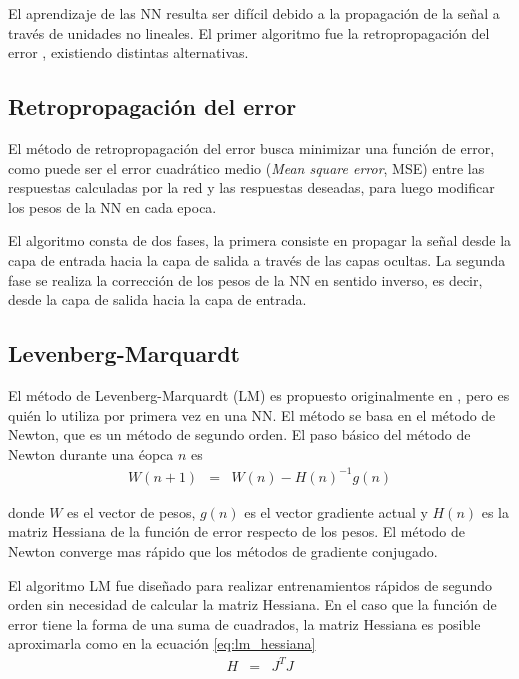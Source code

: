 %
%
%
%
%
%
%
%
%
%
%
%
%
%
%

El aprendizaje de las NN resulta ser difícil debido a la propagación de la señal a través de unidades no lineales. El primer algoritmo fue la retropropagación del error \cite{Werbos1974, Rumelhart1986}, existiendo distintas alternativas.

\subsection{Retropropagación del error}
El método de retropropagación del error busca minimizar una función de error, como puede ser el error cuadrático medio ({\em Mean square error}, MSE) entre las respuestas calculadas por la red y las respuestas deseadas, para luego modificar los pesos de la NN en cada epoca.

El algoritmo consta de dos fases, la primera consiste en propagar la señal desde la capa de entrada hacia la capa de salida a través de las capas ocultas. La segunda fase se realiza la corrección de los pesos de la NN en sentido inverso, es decir, desde la capa de salida hacia la capa de entrada.

\subsection{Levenberg-Marquardt}
El método de Levenberg-Marquardt (LM) \cite{Levenberg1944, Marquardt1963} es propuesto originalmente en \cite{Marquardt1963}, pero es  quién lo utiliza por primera vez en una NN. El método se basa en el método de Newton, que es un método de segundo orden. El paso básico del método de Newton durante una éopca $n$ es
\begin{eqnarray}
	W(n + 1) &=& W(n) - H(n)^{-1}g(n)
\end{eqnarray}

donde $W$ es el vector de pesos, $g(n)$ es el vector gradiente actual y $H(n)$ es la matriz Hessiana de la función de error respecto de los pesos. El método de Newton converge mas rápido que los métodos de gradiente conjugado.

El algoritmo LM fue diseñado para realizar entrenamientos rápidos de segundo orden sin necesidad de calcular la matriz Hessiana. En el caso que la función de error tiene la forma de una suma de cuadrados, la matriz Hessiana es posible aproximarla como en la ecuación \ref{eq:lm_hessiana}
\begin{eqnarray}
	H &=& J^{T}J\label{eq:lm_hessiana}
\end{eqnarray}

